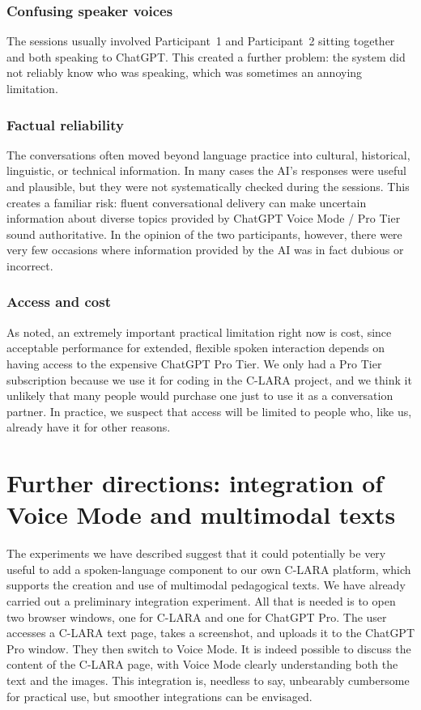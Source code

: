 \documentclass[11pt,a4paper]{article}
\begin{document}
\subsubsection*{Confusing speaker voices}

The sessions usually involved Participant~1 and Participant~2 sitting together and both speaking to ChatGPT. This created a further problem: the system did not reliably know who was speaking, which was sometimes an annoying limitation.

\subsubsection*{Factual reliability}

The conversations often moved beyond language practice into cultural, historical, linguistic, or technical information. In many cases the AI's responses were useful and plausible, but they were not systematically checked during the sessions. This creates a familiar risk: fluent conversational delivery can make uncertain information about diverse topics provided by ChatGPT Voice Mode / Pro Tier sound authoritative. In the opinion of the two participants, however, there were very few occasions where information provided by the AI was in fact dubious or incorrect.

\subsubsection*{Access and cost}

As noted, an extremely important practical limitation right now is cost, since acceptable performance for extended, flexible spoken interaction depends on having access to the expensive ChatGPT Pro Tier. We only had a Pro Tier subscription because we use it for coding in the C-LARA project, and we think it unlikely that many people would purchase one just to use it as a conversation partner. In practice, we suspect that access will be limited to people who, like us, already have it for other reasons.

\section{Further directions: integration of Voice Mode and multimodal texts}

The experiments we have described suggest that it could potentially be very useful to add a spoken-language component to our own C-LARA platform, which supports the creation and use of multimodal pedagogical texts. We have already carried out a preliminary integration experiment. All that is needed is to open two browser windows, one for C-LARA and one for ChatGPT Pro. The user accesses a C-LARA text page, takes a screenshot, and uploads it to the ChatGPT Pro window. They then switch to Voice Mode. It is indeed possible to discuss the content of the C-LARA page, with Voice Mode clearly understanding both the text and the images. This integration is, needless to say, unbearably cumbersome for practical use, but smoother integrations can be envisaged.
\end{document}
